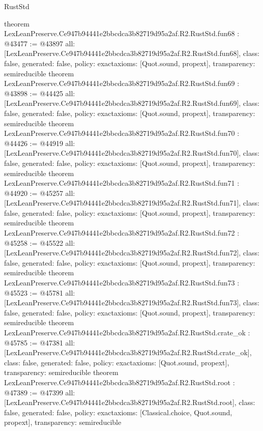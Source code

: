 \begin{lexlean}{RustStd}
\begin{coremodule}
{}
theorem LexLeanPreserve.Ce947b94441e2bbcdca3b82719d95a2af.R2.RustStd.fun68 : @43477 := @43897 {
  all: [LexLeanPreserve.Ce947b94441e2bbcdca3b82719d95a2af.R2.RustStd.fun68],
  class: false,
  generated: false,
  policy: exact{axioms: [Quot.sound, propext]},
  transparency: semireducible
}
theorem LexLeanPreserve.Ce947b94441e2bbcdca3b82719d95a2af.R2.RustStd.fun69 : @43898 := @44425 {
  all: [LexLeanPreserve.Ce947b94441e2bbcdca3b82719d95a2af.R2.RustStd.fun69],
  class: false,
  generated: false,
  policy: exact{axioms: [Quot.sound, propext]},
  transparency: semireducible
}
theorem LexLeanPreserve.Ce947b94441e2bbcdca3b82719d95a2af.R2.RustStd.fun70 : @44426 := @44919 {
  all: [LexLeanPreserve.Ce947b94441e2bbcdca3b82719d95a2af.R2.RustStd.fun70],
  class: false,
  generated: false,
  policy: exact{axioms: [Quot.sound, propext]},
  transparency: semireducible
}
theorem LexLeanPreserve.Ce947b94441e2bbcdca3b82719d95a2af.R2.RustStd.fun71 : @44920 := @45257 {
  all: [LexLeanPreserve.Ce947b94441e2bbcdca3b82719d95a2af.R2.RustStd.fun71],
  class: false,
  generated: false,
  policy: exact{axioms: [Quot.sound, propext]},
  transparency: semireducible
}
theorem LexLeanPreserve.Ce947b94441e2bbcdca3b82719d95a2af.R2.RustStd.fun72 : @45258 := @45522 {
  all: [LexLeanPreserve.Ce947b94441e2bbcdca3b82719d95a2af.R2.RustStd.fun72],
  class: false,
  generated: false,
  policy: exact{axioms: [Quot.sound, propext]},
  transparency: semireducible
}
theorem LexLeanPreserve.Ce947b94441e2bbcdca3b82719d95a2af.R2.RustStd.fun73 : @45523 := @45781 {
  all: [LexLeanPreserve.Ce947b94441e2bbcdca3b82719d95a2af.R2.RustStd.fun73],
  class: false,
  generated: false,
  policy: exact{axioms: [Quot.sound, propext]},
  transparency: semireducible
}
theorem LexLeanPreserve.Ce947b94441e2bbcdca3b82719d95a2af.R2.RustStd.crate_ok : @45785 := @47381 {
  all: [LexLeanPreserve.Ce947b94441e2bbcdca3b82719d95a2af.R2.RustStd.crate_ok],
  class: false,
  generated: false,
  policy: exact{axioms: [Quot.sound, propext]},
  transparency: semireducible
}
theorem LexLeanPreserve.Ce947b94441e2bbcdca3b82719d95a2af.R2.RustStd.root : @47389 := @47399 {
  all: [LexLeanPreserve.Ce947b94441e2bbcdca3b82719d95a2af.R2.RustStd.root],
  class: false,
  generated: false,
  policy: exact{axioms: [Classical.choice, Quot.sound, propext]},
  transparency: semireducible
}


\end{coremodule}
\end{lexlean}

